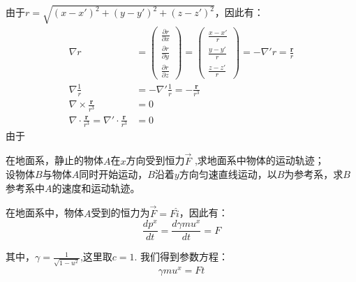 \documentclass{assignment}
\begin{document}
    \begin{sol}
        由于$r = \sqrt{(x-x')^2+(y-y')^2+(z-z')^2}$，因此有：
        \begin{equation}
            \begin{aligned}
            \nabla r &= \left(
                \begin{array}{c}
                    \frac{\partial r}{\partial x}\\
                    \frac{\partial r}{\partial y}\\
                    \frac{\partial r}{\partial z}
                \end{array}
            \right) = \left(
                \begin{array}{c}
                    \frac{x-x'}{r}\\
                    \frac{y-y'}{r}\\
                    \frac{z-z'}{r}
                \end{array}
            \right) = -\nabla ' r = \frac{\mathbf{r}}{r}\\
            \nabla \frac{1}{r} &= -\nabla ' \frac{1}{r} = -\frac{\mathbf{r}}{r^3}\\
            \nabla \times \frac{\mathbf{r}}{r^3} &= 0 \\
            \nabla \cdot \frac{\mathbf{r}}{r^3} = \nabla ' \cdot \frac{\mathbf{r}}{r^3} &= 0
            \end{aligned}
        \end{equation}
        由于
    \end{sol}
    \begin{prob}
        在地面系，静止的物体$A$在$x$方向受到恒力$\overrightarrow{F}$ ,求地面系中物体的运动轨迹；\\
        设物体$B$与物体$A$同时开始运动，$B$沿着$y$方向匀速直线运动，以$B$为参考系，求$B$参考系中$A$的速度和运动轨迹。
    \end{prob}
    \begin{sol}
        在地面系中，物体$A$受到的恒力为$\overrightarrow{F} = F\hat{i}$，因此有：
        \begin{equation}
            \frac{dp^x}{dt} = \frac{d \gamma m u^x}{dt} = F
        \end{equation}
    \end{sol}
    其中，$\gamma = \frac{1}{\sqrt{1-u^2}}$,这里取$c = 1$.
    我们得到参数方程：
    \begin{equation}
        \gamma m u^x = Ft
    \end{equation}
\end{document}
